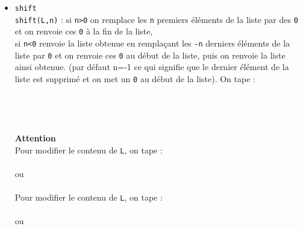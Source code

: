 \documentclass[12pt,a4paper]{book}
\begin{document}
\begin{giacjshere}
\begin{itemize}
\\
{\bf Attention}\\
Pour modifier le contenu de {\tt L}, on tape :\\
\\
ou\\
\\
On tape :\\
\\
\\
{\bf Attention}\\
Pour modifier le contenu de {\tt L}, on tape :\\
\\
ou\\
\item
{\tt shift}\\
{\tt shift(L,n)} : si {\tt n>0} on remplace les {\tt n} premiers 
\'el\'ements de la liste par des {\tt 0} et on renvoie ces {\tt 0} \`a la fin de
la liste,\\
si {\tt n<0} renvoie la liste obtenue  en rempla\c{c}ant les 
{\tt -n} derniers \'el\'ements de la liste par {\tt 0} et on renvoie ces {\tt 0} au d\'ebut de la liste, puis on renvoie la liste ainsi obtenue.
(par défaut n=-1 ce qui signifie que le dernier \'el\'ement de la liste est 
supprim\'e et on met un {\tt 0} au d\'ebut de la liste).
On tape :\\
\\
\\
\\
\\
{\bf Attention}\\
Pour modifier le contenu de {\tt L}, on tape :\\
\\
ou\\
\\
Pour modifier le contenu de {\tt L}, on tape :\\
\\
ou\\

\end{itemize}
\end{giacjshere}
\end{document}
